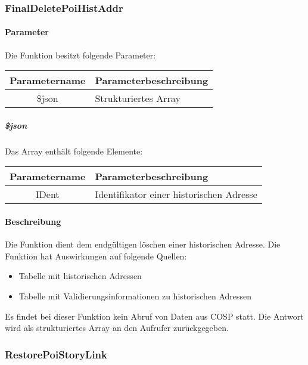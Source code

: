 \subsubsection{FinalDeletePoiHistAddr}
\paragraph{Parameter} Die Funktion besitzt folgende Parameter:
\begin{table}[H]
	\begin{tabular}{|c|p{11cm}|}
		\hline
		\textbf{Parametername} & \textbf{Parameterbeschreibung} \\ \hline
		\$json & Strukturiertes Array \\ \hline
	\end{tabular}
\end{table}
\subparagraph{\$json}Das Array enthält folgende Elemente:
\begin{table}[H]
	\begin{tabular}{|c|p{11cm}|}
		\hline
		\textbf{Parametername} & \textbf{Parameterbeschreibung} \\ \hline
		IDent & Identifikator einer historischen Adresse \\ \hline
	\end{tabular}
\end{table}
\paragraph{Beschreibung} Die Funktion dient dem endgültigen löschen einer historischen Adresse. Die Funktion hat Auswirkungen auf folgende Quellen:
\begin{itemize}
	\item Tabelle mit historischen Adressen
	\item Tabelle mit Validierungsinformationen zu historischen Adressen
\end{itemize}
Es findet bei dieser Funktion kein Abruf von Daten aus {\glqq COSP\grqq} statt. Die Antwort wird als strukturiertes Array an den Aufrufer zurückgegeben.
\subsubsection{RestorePoiStoryLink}
